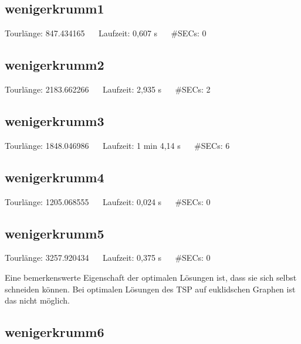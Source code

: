\documentclass[a4paper, 10pt, ngerman]{article}
\begin{document}
\subsection{wenigerkrumm1}



\noindent Tourlänge: 847.434165 $\quad$ Laufzeit: 0,607 s $\quad$ \#SECs: 0

\subsection{wenigerkrumm2}



\noindent Tourlänge: 2183.662266 $\quad$ Laufzeit: 2,935 s $\quad$ \#SECs: 2

\subsection{wenigerkrumm3}



\noindent Tourlänge: 1848.046986 $\quad$ Laufzeit: 1 min 4,14 s $\quad$ \#SECs: 6

\subsection{wenigerkrumm4}



\noindent Tourlänge: 1205.068555 $\quad$ Laufzeit: 0,024 s $\quad$ \#SECs: 0

\subsection{wenigerkrumm5}



\noindent Tourlänge: 3257.920434 $\quad$ Laufzeit: 0,375 s $\quad$ \#SECs: 0
\medskip

\noindent Eine bemerkenswerte Eigenschaft der optimalen Lösungen ist, dass sie sich selbst schneiden können. Bei optimalen Lösungen des TSP auf euklidschen Graphen ist das nicht möglich. 

\subsection{wenigerkrumm6}
\end{document}
